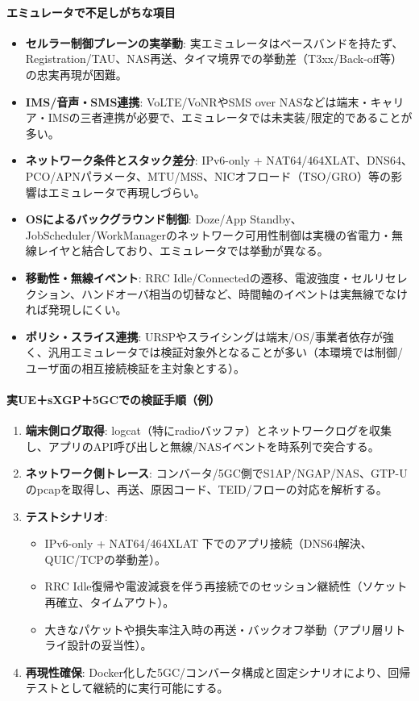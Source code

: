 \paragraph{エミュレータで不足しがちな項目}
\begin{itemize}
	\item \textbf{セルラー制御プレーンの実挙動}: 実エミュレータはベースバンドを持たず、Registration/TAU、NAS再送、タイマ境界での挙動差（T3xx/Back-off等）の忠実再現が困難。
	\item \textbf{IMS/音声・SMS連携}: VoLTE/VoNRやSMS over NASなどは端末・キャリア・IMSの三者連携が必要で、エミュレータでは未実装/限定的であることが多い。
	\item \textbf{ネットワーク条件とスタック差分}: IPv6-only + NAT64/464XLAT、DNS64、PCO/APNパラメータ、MTU/MSS、NICオフロード（TSO/GRO）等の影響はエミュレータで再現しづらい。
	\item \textbf{OSによるバックグラウンド制御}: Doze/App Standby、JobScheduler/WorkManagerのネットワーク可用性制御は実機の省電力・無線レイヤと結合しており、エミュレータでは挙動が異なる。
	\item \textbf{移動性・無線イベント}: RRC Idle/Connectedの遷移、電波強度・セルリセレクション、ハンドオーバ相当の切替など、時間軸のイベントは実無線でなければ発現しにくい。
	\item \textbf{ポリシ・スライス連携}: URSPやスライシングは端末/OS/事業者依存が強く、汎用エミュレータでは検証対象外となることが多い（本環境では制御/ユーザ面の相互接続検証を主対象とする）。
\end{itemize}

\paragraph{実UE＋sXGP＋5GCでの検証手順（例）}
\begin{enumerate}
	\item \textbf{端末側ログ取得}: logcat（特にradioバッファ）とネットワークログを収集し、アプリのAPI呼び出しと無線/NASイベントを時系列で突合する。
	\item \textbf{ネットワーク側トレース}: コンバータ/5GC側でS1AP/NGAP/NAS、GTP-Uのpcapを取得し、再送、原因コード、TEID/フローの対応を解析する。
	\item \textbf{テストシナリオ}:
		\begin{itemize}
			\item IPv6-only + NAT64/464XLAT 下でのアプリ接続（DNS64解決、QUIC/TCPの挙動差）。
			\item RRC Idle復帰や電波減衰を伴う再接続でのセッション継続性（ソケット再確立、タイムアウト）。
			\item 大きなパケットや損失率注入時の再送・バックオフ挙動（アプリ層リトライ設計の妥当性）。
		\end{itemize}
	\item \textbf{再現性確保}: Docker化した5GC/コンバータ構成と固定シナリオにより、回帰テストとして継続的に実行可能にする。
\end{enumerate}

